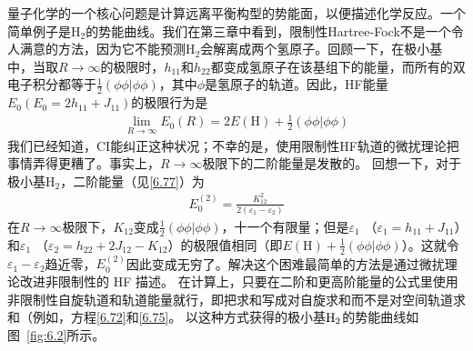量子化学的一个核心问题是计算远离平衡构型的势能面，以便描述化学反应。一个简单例子是$\mathrm{H_2}$的势能曲线。我们在第三章中看到，限制性Hartree-Fock不是一个令人满意的方法，因为它不能预测$\mathrm{H_2}$会解离成两个氢原子。回顾一下，在极小基中，当取$R\to\infty$的极限时，$h_{11}$和$h_{22}$都变成氢原子在该基组下的能量，而所有的双电子积分都等于$\frac{1}{2}(\phi\phi|\phi\phi)$，其中$\phi$是氢原子的轨道。因此，HF能量$E_0(E_0=2h_{11}+J_{11})$的极限行为是
\begin{align}
	\lim_{R\to\infty} E_0(R) = 2E(\mathrm{H}) + \frac{1}{2}(\phi\phi|\phi\phi)
\end{align}
我们已经知道，CI能纠正这种状况；不幸的是，使用限制性HF轨道的微扰理论把事情弄得更糟了。事实上，$R\to\infty$极限下的二阶能量是发散的。 回想一下，对于极小基$\mathrm{H_2}$，二阶能量（见\autoref{6.77}）为
\begin{align}
	E_0^{(2)}  = \frac{K_{12}^2}{2(\varepsilon_1 - \varepsilon_2)}
\end{align}
在$R\to\infty$极限下，$K_{12}$变成$\frac{1}{2}(\phi\phi|\phi\phi)$，十一个有限量；但是$\varepsilon_1$ （$\varepsilon_1=h_{11}+J_{11}$）和$\varepsilon_1$ （$\varepsilon_2=h_{22}+2J_{12}-K_{12}$）的极限值相同（即$E(\mathrm{H})+\frac{1}{2}(\phi\phi|\phi\phi)$）。这就令$\varepsilon_1-\varepsilon_2$趋近零，$E_0^{(2)}$因此变成无穷了。解决这个困难最简单的方法是通过微扰理论改进非限制性的 HF 描述。 在计算上，只要在二阶和更高阶能量的公式里使用非限制性自旋轨道和轨道能量就行，即把求和写成对自旋求和而不是对空间轨道求和（例如，方程\autoref{6.72}和\autoref{6.75}。 以这种方式获得的极小基$\mathrm{H}_2$的势能曲线如图~\autoref{fig:6.2}所示。
